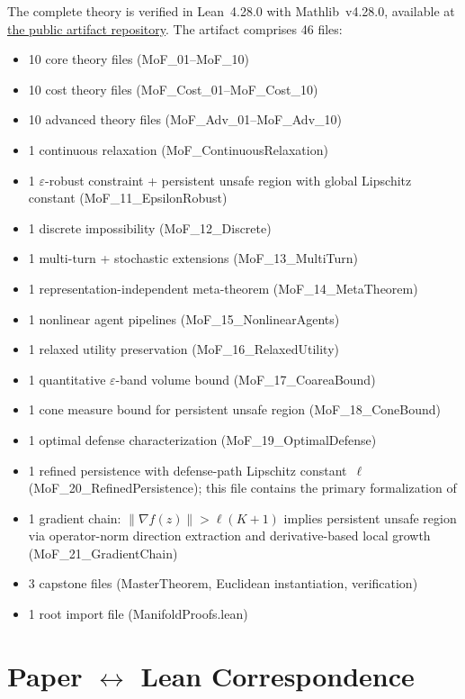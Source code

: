 \documentclass[11pt]{article}
\begin{document}
The complete theory is verified in Lean~4.28.0 with Mathlib~v4.28.0,
available at
\href{https://github.com/mbhatt1/stuff/tree/main/ManifoldProofs}{the public artifact repository}.
The artifact comprises 46 files:
\begin{itemize}[nosep]
  \item 10 core theory files (MoF\_01--MoF\_10)
  \item 10 cost theory files (MoF\_Cost\_01--MoF\_Cost\_10)
  \item 10 advanced theory files (MoF\_Adv\_01--MoF\_Adv\_10)
  \item 1 continuous relaxation (MoF\_ContinuousRelaxation)
  \item 1 $\varepsilon$-robust constraint + persistent unsafe region
    with global Lipschitz constant
    (MoF\_11\_EpsilonRobust)
  \item 1 discrete impossibility (MoF\_12\_Discrete)
  \item 1 multi-turn + stochastic extensions
    (MoF\_13\_MultiTurn)
  \item 1 representation-independent meta-theorem
    (MoF\_14\_MetaTheorem)
  \item 1 nonlinear agent pipelines (MoF\_15\_NonlinearAgents)
  \item 1 relaxed utility preservation (MoF\_16\_RelaxedUtility)
  \item 1 quantitative $\varepsilon$-band volume bound
    (MoF\_17\_CoareaBound)
  \item 1 cone measure bound for persistent unsafe region
    (MoF\_18\_ConeBound)
  \item 1 optimal defense characterization
    (MoF\_19\_OptimalDefense)
  \item 1 refined persistence with defense-path Lipschitz constant~$\ell$
    (MoF\_20\_RefinedPersistence); this file contains the primary
    formalization of 
  \item 1 gradient chain: $\|\nabla f(z)\| > \ell(K+1)$ implies
    persistent unsafe region via operator-norm direction extraction
    and derivative-based local growth
    (MoF\_21\_GradientChain)
  \item 3 capstone files (MasterTheorem, Euclidean instantiation,
    verification)
  \item 1 root import file (ManifoldProofs.lean)
\end{itemize}


\section{Paper \texorpdfstring{$\leftrightarrow$}{<->} Lean Correspondence}
\label{app:lean-correspondence}
\end{document}
